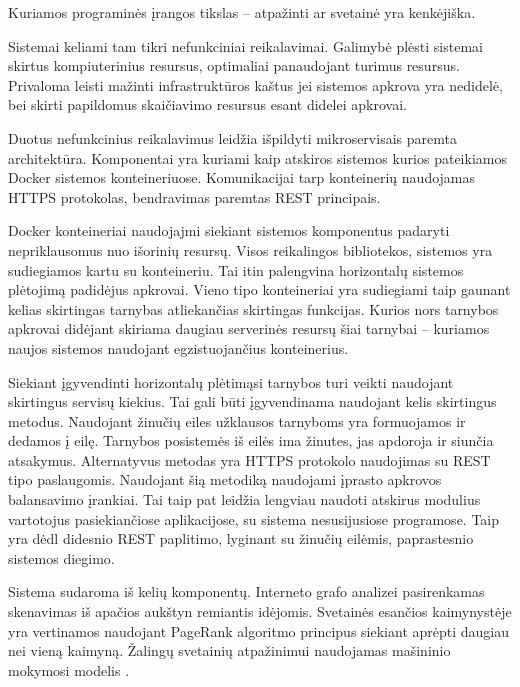 
Kuriamos programinės įrangos tikslas -- atpažinti ar svetainė yra kenkėjiška.

Sistemai keliami tam tikri nefunkciniai reikalavimai. Galimybė plėsti sistemai skirtus kompiuterinius resursus, optimaliai
panaudojant turimus resursus. Privaloma leisti mažinti infrastruktūros kaštus jei sistemos apkrova yra nedidelė, bei
skirti papildomus skaičiavimo resursus esant didelei apkrovai.

Duotus nefunkcinius reikalavimus leidžia išpildyti mikroservisais paremta architektūra. Komponentai yra kuriami kaip
atskiros sistemos kurios pateikiamos Docker sistemos konteineriuose. Komunikacijai tarp konteinerių naudojamas HTTPS
protokolas, bendravimas paremtas REST principais.

Docker konteineriai naudojajmi siekiant sistemos komponentus padaryti nepriklausomus nuo išorinių resursų. Visos
reikalingos bibliotekos, sistemos yra sudiegiamos kartu su konteineriu. Tai itin palengvina horizontalų sistemos
plėtojimą padidėjus apkrovai. Vieno tipo konteineriai yra sudiegiami taip gaunant kelias skirtingas tarnybas
atliekančias skirtingas funkcijas. Kurios nors tarnybos apkrovai didėjant skiriama daugiau serverinės resursų šiai
tarnybai -- kuriamos naujos sistemos naudojant egzistuojančius konteinerius.

Siekiant įgyvendinti horizontalų plėtimąsi tarnybos turi veikti naudojant skirtingus servisų kiekius. Tai gali būti
įgyvendinama naudojant kelis skirtingus metodus. Naudojant žinučių eiles užklausos tarnyboms yra formuojamos ir dedamos
į eilę. Tarnybos posistemės iš eilės ima žinutes, jas apdoroja ir siunčia atsakymus. Alternatyvus metodas yra HTTPS
protokolo naudojimas su REST tipo paslaugomis. Naudojant šią metodiką naudojami įprasto apkrovos balansavimo įrankiai.
Tai taip pat leidžia lengviau naudoti atskirus modulius vartotojus pasiekiančiose aplikacijose, su sistema nesusijusiose
programose. Taip yra dėdl didesnio REST paplitimo, lyginant su žinučių eilėmis, paprastesnio sistemos diegimo.

Sistema sudaroma iš kelių komponentų. Interneto grafo analizei pasirenkamas skenavimas iš apačios aukštyn
remiantis \cite{webcop} idėjomis. Svetainės esančios kaimynystėje yra vertinamos naudojant PageRank algoritmo
principus \cite{pagerank} siekiant aprėpti daugiau nei vieną kaimyną. Žalingų svetainių atpažinimui naudojamas
mašininio mokymosi modelis \cite{trees}.


